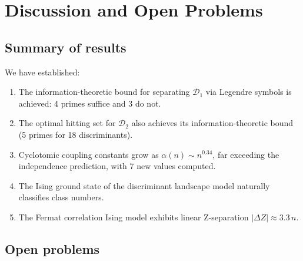 \documentclass[11pt]{amsart}
\theoremstyle{definition}
\begin{document}
\section{Discussion and Open Problems}
\label{sec:discussion}

\subsection{Summary of results}

We have established:
\begin{enumerate}[label=(\arabic*)]
\item The information-theoretic bound for separating $\mathcal{D}_1$ via Legendre symbols is achieved: 4 primes suffice and 3 do not.
\item The optimal hitting set for $\mathcal{D}_2$ also achieves its information-theoretic bound (5 primes for 18 discriminants).
\item Cyclotomic coupling constants grow as $\alpha(n) \sim n^{0.34}$, far exceeding the independence prediction, with 7 new values computed.
\item The Ising ground state of the discriminant landscape model naturally classifies class numbers.
\item The Fermat correlation Ising model exhibits linear Z-separation $|\Delta Z| \approx 3.3\,n$.
\end{enumerate}

\subsection{Open problems}
\end{document}
